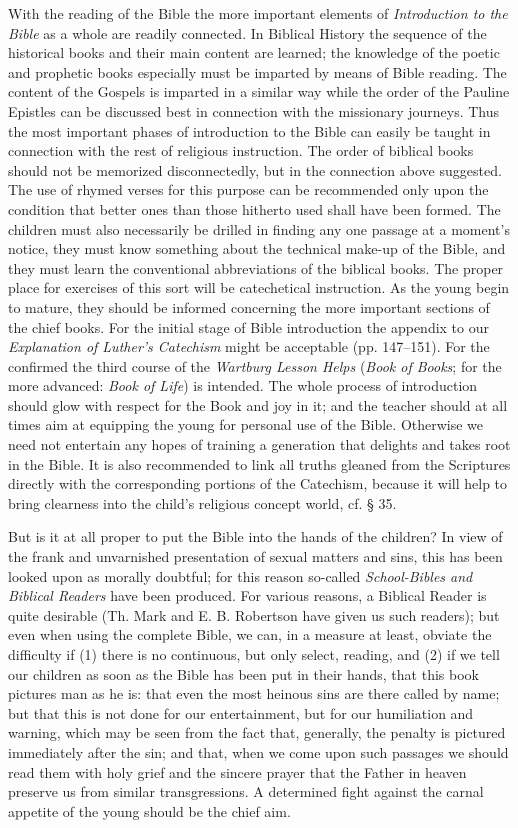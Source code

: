 With the reading of the Bible the more important elements of \emph{Introduction to the Bible} as a whole are readily connected. In Biblical History the sequence of the historical books and their main content are learned; the knowledge of the poetic and prophetic books especially must be imparted by means of Bible reading. The content of the Gospels is imparted in a similar way while the order of the Pauline Epistles can be discussed best in connection with the missionary journeys. Thus the most important phases of introduction to the Bible can easily be taught in connection with the rest of religious instruction. The order of biblical books should not be memorized disconnectedly, but in the connection above suggested. The use of rhymed verses for this purpose can be recommended only upon the condition that better ones than those hitherto used shall have been formed. The children must also necessarily be drilled in finding any one passage at a moment’s notice, they must know something about the technical make-up of the Bible, and they must learn the conventional abbreviations of the biblical books. The proper place for exercises of this sort will be catechetical instruction. As the young begin to mature, they should be
informed concerning the more important sections of the chief books. For the initial stage of Bible introduction the appendix to our \emph{Explanation of Luther’s Catechism} might be acceptable (pp. 147–151). For the confirmed the third course of the \emph{Wartburg Lesson Helps} (\emph{Book of Books}; for the more advanced: \emph{Book of Life}) is intended. The whole process of introduction should glow with respect for the Book and joy in it; and the teacher should at all times aim at equipping the young for personal use of the Bible. Otherwise we need not entertain any hopes of training a generation that delights and takes root in the Bible. It is also recommended to link all truths gleaned from the Scriptures directly with the corresponding portions of the Catechism, because it will help to bring clearness into the child’s religious concept world, cf. § 35.

But is it at all proper to put the Bible into the hands of the children? In view of the frank and unvarnished presentation of sexual matters and sins, this has been looked upon as morally doubtful; for this reason so-called \emph{School-Bibles and Biblical Readers} have been produced. For various reasons, a Biblical Reader is quite desirable (Th. Mark and E. B. Robertson have given us such readers); but even when using the complete Bible, we can, in a measure at least, obviate the difficulty if (1) there is no continuous, but only select, reading, and (2) if we tell our children as soon as the Bible has been put in their hands, that this book pictures man as he is: that even the most heinous sins are there called by name; but that this is not done for our entertainment, but for our humiliation and warning, which may be seen from the fact that, generally, the penalty is pictured immediately after the sin; and that, when we come upon such passages we should read them with holy grief and the sincere prayer that the Father in heaven preserve us from similar transgressions. A determined fight against the carnal appetite of the young should be the chief aim.

